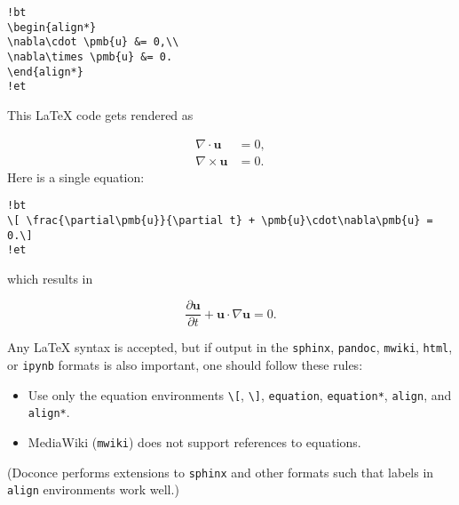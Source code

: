 \documentclass[%
oneside,                 %
final,                   %
10pt]{article}
\begin{document}
\begin{Verbatim}[numbers=none,fontsize=\fontsize{9pt}{9pt},baselinestretch=0.85,xleftmargin=0mm]
!bt
\begin{align*}
\nabla\cdot \pmb{u} &= 0,\\
\nabla\times \pmb{u} &= 0.
\end{align*}
!et
\end{Verbatim}

This {\LaTeX} code gets rendered as

\begin{align*}
\nabla\cdot \pmb{u} &= 0,\\
\nabla\times \pmb{u} &= 0.
\end{align*}
Here is a single equation:

\begin{Verbatim}[numbers=none,fontsize=\fontsize{9pt}{9pt},baselinestretch=0.85,xleftmargin=0mm]
!bt
\[ \frac{\partial\pmb{u}}{\partial t} + \pmb{u}\cdot\nabla\pmb{u} = 0.\]
!et
\end{Verbatim}
which results in

\[ \frac{\partial\pmb{u}}{\partial t} + \pmb{u}\cdot\nabla\pmb{u} = 0.\]

Any {\LaTeX} syntax is accepted, but if output in the \Verb!sphinx!, \Verb!pandoc!,
\Verb!mwiki!, \Verb!html!, or \Verb!ipynb! formats
is also important, one should follow these rules:

\begin{itemize}
  \item Use only the equation environments \Verb!\[!, \Verb!\]!,
    \Verb!equation!, \Verb!equation*!, \Verb!align!, and \Verb!align*!.

  \item MediaWiki (\Verb!mwiki!) does not support references to equations.
\end{itemize}

\noindent
(Doconce performs extensions to \Verb!sphinx! and other formats such that
labels in \Verb!align! environments work well.)


\setlength{\fboxrule}{2pt}
\begin{center}
\end{center}
\setlength{\fboxrule}{0.4pt} %
\end{document}

